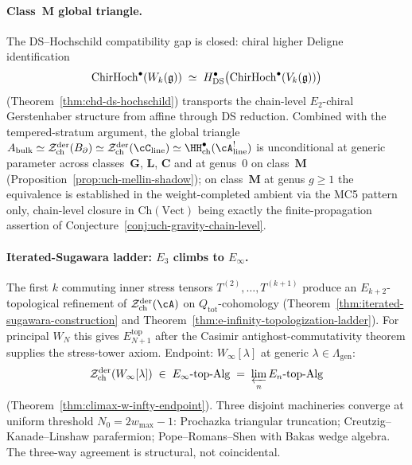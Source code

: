 \paragraph{Class~$\mathbf{M}$ global triangle.}
The DS--Hochschild compatibility gap is closed: chiral higher
Deligne identification
\[
\mathrm{ChirHoch}^\bullet(W_k(\mathfrak{g}))
\;\simeq\;
H^\bullet_{\mathrm{DS}}\bigl(\mathrm{ChirHoch}^\bullet(V_k(\mathfrak{g}))\bigr)
\]
(Theorem~\ref{thm:chd-ds-hochschild}) transports the chain-level
$E_2$-chiral Gerstenhaber structure from affine through DS
reduction. Combined with the tempered-stratum argument, the global
triangle
$\Abulk \simeq \cZ^{\mathrm{der}}_{\mathrm{ch}}(\Bbound) \simeq
\cZ^{\mathrm{der}}_{\mathrm{ch}}(\cC_{\mathrm{line}}) \simeq
\HH^\bullet_{\mathrm{ch}}(\cA^!_{\mathrm{line}})$ is
unconditional at generic parameter across classes~$\mathbf{G}$,
$\mathbf{L}$, $\mathbf{C}$ and at genus~$0$ on
class~$\mathbf{M}$ (Proposition~\ref{prop:uch-mellin-shadow});
on class~$\mathbf{M}$ at genus $g \geq 1$ the equivalence is
established in the weight-completed ambient via the MC5 pattern
only, chain-level closure in $\mathrm{Ch}(\mathrm{Vect})$
being exactly the finite-propagation assertion of
Conjecture~\ref{conj:uch-gravity-chain-level}.

\paragraph{Iterated-Sugawara ladder: $E_3$ climbs to $E_\infty$.}
The first $k$ commuting inner stress tensors
$T^{(2)},\ldots,T^{(k+1)}$ produce an
$E_{k+2}$-topological refinement of
$\cZ^{\mathrm{der}}_{\mathrm{ch}}(\cA)$ on
$Q_{\mathrm{tot}}$-cohomology
(Theorem~\ref{thm:iterated-sugawara-construction} and
Theorem~\ref{thm:e-infinity-topologization-ladder}). For principal
$W_N$ this gives $E_{N+1}^{\mathrm{top}}$ after the Casimir
antighost-commutativity theorem supplies the stress-tower axiom.
Endpoint:
$W_\infty[\lambda]$ at generic
$\lambda \in \Lambda_{\mathrm{gen}}$:
\[
\mathcal{Z}^{\mathrm{der}}_{\mathrm{ch}}(W_\infty[\lambda])
\;\in\;
E_\infty\text{-}\mathrm{top}\text{-}\mathrm{Alg}
\;=\;
\varprojlim_n E_n\text{-}\mathrm{top}\text{-}\mathrm{Alg}
\]
(Theorem~\ref{thm:climax-w-infty-endpoint}). Three disjoint
machineries converge at uniform threshold $N_0 = 2 w_{\max} - 1$:
Prochazka triangular truncation; Creutzig--Kanade--Linshaw
parafermion; Pope--Romans--Shen with Bakas wedge algebra. The
three-way agreement is structural, not coincidental.


